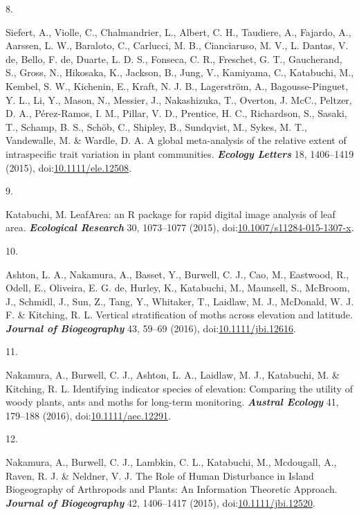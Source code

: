 \documentclass[
]{article}
\newlength{\cslhangindent}
\newlength{\csllabelwidth}
\newlength{\cslentryspacingunit} %
\newenvironment{CSLReferences}[2] %
 {%
  \setlength{\parindent}{0pt}
  \ifodd #1
  \let\oldpar\par
  \def\par{\hangindent=\cslhangindent\oldpar}
  \fi
  \setlength{\parskip}{#2\cslentryspacingunit}
 }%
 {}
\newcommand{\CSLLeftMargin}[1]{\parbox[t]{\csllabelwidth}{#1}}
\newcommand{\CSLRightInline}[1]{\parbox[t]{\linewidth - \csllabelwidth}{#1}\break}
\begin{document}
\begin{CSLReferences}{0}{0}
\leavevmode{}%
\CSLLeftMargin{8. }
\CSLRightInline{Siefert, A., Violle, C., Chalmandrier, L., Albert, C.
H., Taudiere, A., Fajardo, A., Aarssen, L. W., Baraloto, C., Carlucci,
M. B., Cianciaruso, M. V., L. Dantas, V. de, Bello, F. de, Duarte, L. D.
S., Fonseca, C. R., Freschet, G. T., Gaucherand, S., Gross, N.,
Hikosaka, K., Jackson, B., Jung, V., Kamiyama, C., Katabuchi, M.,
Kembel, S. W., Kichenin, E., Kraft, N. J. B., Lagerström, A.,
Bagousse-Pinguet, Y. L., Li, Y., Mason, N., Messier, J., Nakashizuka,
T., Overton, J. McC., Peltzer, D. A., Pérez-Ramos, I. M., Pillar, V. D.,
Prentice, H. C., Richardson, S., Sasaki, T., Schamp, B. S., Schöb, C.,
Shipley, B., Sundqvist, M., Sykes, M. T., Vandewalle, M. \& Wardle, D.
A. A global meta-analysis of the relative extent of intraspecific trait
variation in plant communities. \textbf{\emph{Ecology Letters}} 18,
1406--1419 (2015),
doi:\href{https://doi.org/10.1111/ele.12508}{10.1111/ele.12508}.}

\leavevmode{}%
\CSLLeftMargin{9. }
\CSLRightInline{Katabuchi, M. {LeafArea: an R package for rapid digital
image analysis of leaf area}. \textbf{\emph{Ecological Research}} 30,
1073--1077 (2015),
doi:\href{https://doi.org/10.1007/s11284-015-1307-x}{10.1007/s11284-015-1307-x}.}

\leavevmode{}%
\CSLLeftMargin{10. }
\CSLRightInline{Ashton, L. A., Nakamura, A., Basset, Y., Burwell, C. J.,
Cao, M., Eastwood, R., Odell, E., Oliveira, E. G. de, Hurley, K.,
Katabuchi, M., Maunsell, S., McBroom, J., Schmidl, J., Sun, Z., Tang,
Y., Whitaker, T., Laidlaw, M. J., McDonald, W. J. F. \& Kitching, R. L.
Vertical stratification of moths across elevation and latitude.
\textbf{\emph{Journal of Biogeography}} 43, 59--69 (2016),
doi:\href{https://doi.org/10.1111/jbi.12616}{10.1111/jbi.12616}.}

\leavevmode{}%
\CSLLeftMargin{11. }
\CSLRightInline{Nakamura, A., Burwell, C. J., Ashton, L. A., Laidlaw, M.
J., Katabuchi, M. \& Kitching, R. L. {Identifying indicator species of
elevation: Comparing the utility of woody plants, ants and moths for
long-term monitoring}. \textbf{\emph{Austral Ecology}} 41, 179--188
(2016),
doi:\href{https://doi.org/10.1111/aec.12291}{10.1111/aec.12291}.}

\leavevmode{}%
\CSLLeftMargin{12. }
\CSLRightInline{Nakamura, A., Burwell, C. J., Lambkin, C. L., Katabuchi,
M., Mcdougall, A., Raven, R. J. \& Neldner, V. J. {The Role of Human
Disturbance in Island Biogeography of Arthropods and Plants: An
Information Theoretic Approach}. \textbf{\emph{Journal of Biogeography}}
42, 1406--1417 (2015),
doi:\href{https://doi.org/10.1111/jbi.12520}{10.1111/jbi.12520}.}


\end{CSLReferences}
\end{document}
